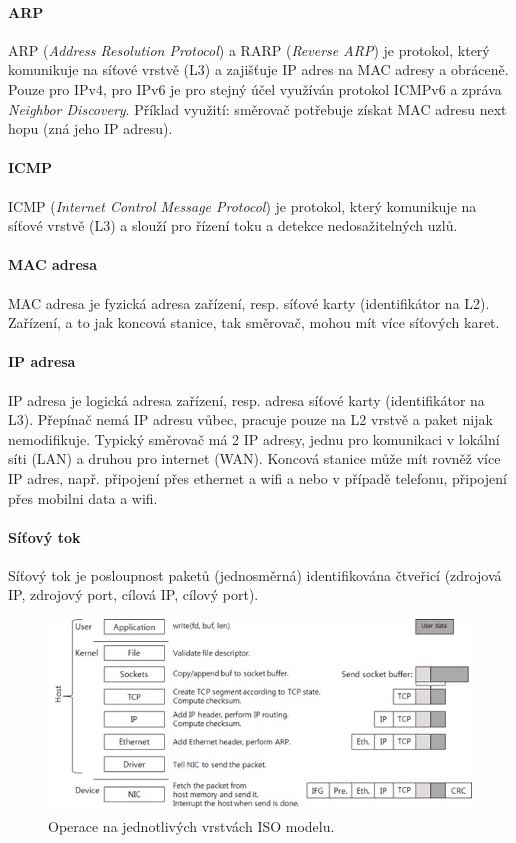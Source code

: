 \paragraph*{ARP} ARP (\textit{Address Resolution Protocol}) a RARP (\textit{Reverse ARP}) je protokol, který komunikuje na síťové vrstvě (L3) a zajišťuje  IP adres na MAC adresy a obráceně. Pouze pro IPv4, pro IPv6 je pro stejný účel využíván protokol ICMPv6 a zpráva \textit{Neighbor Discovery}. Příklad využití: směrovač potřebuje získat MAC adresu next hopu (zná jeho IP adresu).

\paragraph*{ICMP} ICMP (\textit{Internet Control Message Protocol}) je protokol, který komunikuje na síťové vrstvě (L3) a slouží pro řízení toku a detekce nedosažitelných uzlů.

\paragraph*{MAC adresa} MAC adresa je fyzická adresa zařízení, resp. síťové karty (identifikátor na L2). Zařízení, a to jak koncová stanice, tak směrovač, mohou mít více síťových karet.

\paragraph*{IP adresa} IP adresa je logická adresa zařízení, resp. adresa síťové karty (identifikátor na L3). Přepínač nemá IP adresu vůbec, pracuje pouze na L2 vrstvě a paket nijak nemodifikuje. Typický směrovač má 2 IP adresy, jednu pro komunikaci v lokální síti (LAN) a druhou pro internet (WAN). Koncová stanice může mít rovněž více IP adres, např. připojení přes ethernet a wifi a nebo v případě telefonu, připojení přes mobilni data a wifi.

\paragraph*{Síťový tok} Síťový tok je posloupnost paketů (jednosměrná) identifikována čtveřicí (zdrojová IP, zdrojový port, cílová IP, cílový port).

\begin{figure}[H]
    \centering
    \includegraphics[width=1\linewidth]{operation_process_by_each_layer.png}
    \caption{Operace na jednotlivých vrstvách ISO modelu.}
\end{figure}
